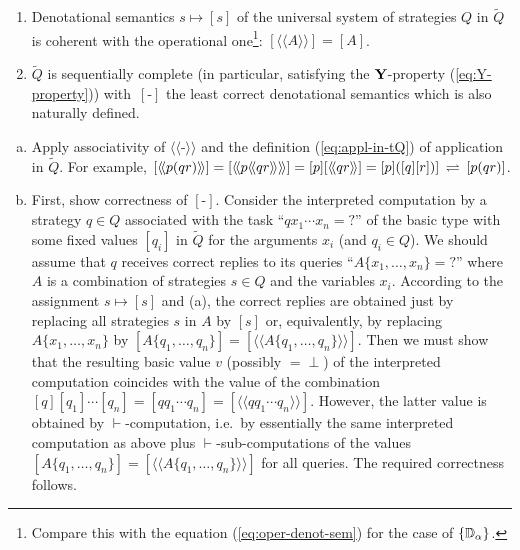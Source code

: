 \documentclass[fleqn]{LMCS}
\theoremstyle{plain}\newtheorem{satz}[thm]{Satz}
\theoremstyle{plain}\newtheorem{hyp}[thm]{Hypothesis}
\theoremstyle{plain}\newtheorem{hyps}[thm]{Hypotheses}
\theoremstyle{definition}\newtheorem{note}[thm]{Note}
\newcommand{\defis}{\mbox{-}}
\newcommand{\setof}[1]{\{#1\}}
\newcommand{\bYdef}{\mathrel{\BYDEF}}
\newcommand{\BYDEF}{\mbox{$\hspace{.2em}\rightleftharpoons\hspace{.2em}$}}
\newcommand{\lla}{\langle\!\langle}
\newcommand{\rra}{\rangle\!\rangle}
\newcommand{\Osem}[1]{\lla #1 \rra}
\newcommand{\Y}{\mbox{\bf Y}}
\newcommand{\Undef}{{\perp}}
\newcommand{\tQ}{\tilde{Q}}
\newcommand{\?}{\mbox{?}}
\begin{document}
\begin{thm}\hfill  \label{th:least-correct-sem}
\begin{enumerate}[\em(a)]
\item Denotational semantics $s\mapsto [s]$
of the universal system of strategies $Q$ in $\tQ$ is coherent 
with the operational one\footnote{Compare this with the equation (\ref{eq:oper-denot-sem}) for 
the case of $\setof{\bbD_\alpha}$. 
}:
$
[\Osem{A}]=[A] 
$. 

\item $\tQ$ is sequentially complete 
(in particular, satisfying the $\Y$-property (\ref{eq:Y-property})) 
with~$[\defis]$ the least correct denotational semantics 
which is also naturally defined. 
\end{enumerate}
\end{thm}
\proof\hfill  \begin{enumerate}[(a)]
\item Apply associativity of $\Osem{\defis}$ and the definition 
(\ref{eq:appl-in-tQ}) of application in $\tQ$. 
For example, $[\Osem{p(qr)}]=[\Osem{p\Osem{qr}}]=[p][\Osem{qr}]=
[p]([q][r])]\bYdef [p(qr)]$. 

\item First, show correctness of $[\defis]$. 
Consider the interpreted computation by a strategy $q\in Q$ 
associated with the task ``$qx_1\cdots x_n=\?$'' 
of the basic type
with some fixed values $[q_i]$ in $\tQ$ 
for the arguments $x_i$ (and
$q_i\in Q$). We should assume that $q$ receives correct replies to its queries
``$A\{x_1,\ldots,x_n\}=\?$'' where $A$ is a combination of strategies
$s\in Q$ and the variables $x_i$. According to the assignment $s\mapsto [s]$ 
and (a),
the correct replies are obtained
just by replacing all strategies $s$ in $A$ by $[s]$ or, equivalently, by replacing
$A\{x_1,\ldots,x_n\}$ by 
$[A\{q_1,\ldots, q_n\}]=[\Osem{A\{q_1,\ldots, q_n\}}]$.
Then we must show that the resulting basic value $v$ 
(possibly ${}=\Undef$) 
of the interpreted 
computation coincides with the value of the combination
$[q][q_1]\cdots [q_n]= [q q_1\cdots q_n]=[\Osem{q q_1\cdots q_n}]$.
However, the latter value is
obtained by $\vdash$-computation, i.e.\ by 
essentially the same interpreted computation as above 
plus $\vdash$-sub-computations of the values
$[A\{q_1,\ldots, q_n\}]=[\Osem{A\{q_1,\ldots, q_n\}}]$ for all queries.
The required correctness follows.



\end{enumerate}
\end{document}

